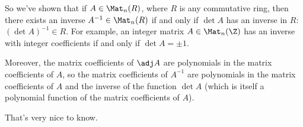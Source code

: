 So we've shown that if $A\in\Mat_n(R)$, where $R$ is any commutative ring, then there exists an inverse  $A^{-1}\in\Mat_n(R)$ if and only if $\det A$ has an inverse in $R$: $\left( \det A \right)^{-1}\in R$. For example, an integer matrix $A\in\Mat_n(\Z)$ has an inverse with integer coefficients if and only if $\det A=\pm 1$.

Moreover, the matrix coefficients of $\adj A$ are polynomials in the matrix coefficients of $A$, so the matrix coefficients of $A^{-1}$ are polynomials in the matrix coefficients of $A$ and the inverse of the function $\det A$ (which is itself a polynomial function of the matrix coefficients of $A$).

That's very nice to know.

